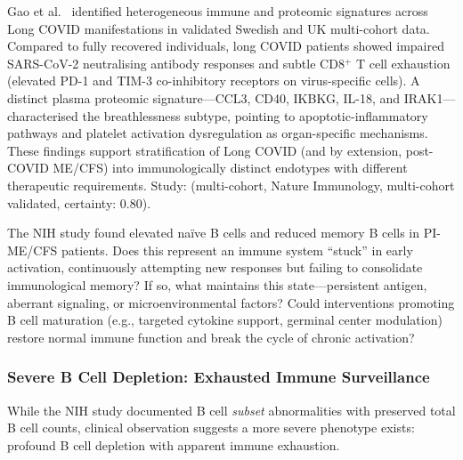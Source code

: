 \begin{achievement}
\label{ach:gao2025-long-covid-biomarkers}
Gao et al.~\cite{Gao2025LongCovidBiomarkers} identified heterogeneous immune and proteomic signatures across Long COVID manifestations in validated Swedish and UK multi-cohort data. Compared to fully recovered individuals, long COVID patients showed impaired SARS-CoV-2 neutralising antibody responses and subtle CD8$^+$ T cell exhaustion (elevated PD-1 and TIM-3 co-inhibitory receptors on virus-specific cells). A distinct plasma proteomic signature---CCL3, CD40, IKBKG, IL-18, and IRAK1---characterised the breathlessness subtype, pointing to apoptotic-inflammatory pathways and platelet activation dysregulation as organ-specific mechanisms. These findings support stratification of Long COVID (and by extension, post-COVID ME/CFS) into immunologically distinct endotypes with different therapeutic requirements.
Study: (multi-cohort, Nature Immunology, multi-cohort validated, certainty: 0.80).
\end{achievement}

\begin{open_question}
The NIH study found elevated naïve B cells and reduced memory B cells in PI-ME/CFS patients. Does this represent an immune system ``stuck'' in early activation, continuously attempting new responses but failing to consolidate immunological memory? If so, what maintains this state---persistent antigen, aberrant signaling, or microenvironmental factors? Could interventions promoting B cell maturation (e.g., targeted cytokine support, germinal center modulation) restore normal immune function and break the cycle of chronic activation?
\end{open_question}

\subsubsection{Severe B Cell Depletion: Exhausted Immune Surveillance}
\label{sec:exhausted-surveillance}

While the NIH study documented B cell \textit{subset} abnormalities with preserved total B cell counts, clinical observation suggests a more severe phenotype exists: profound B cell depletion with apparent immune exhaustion.

